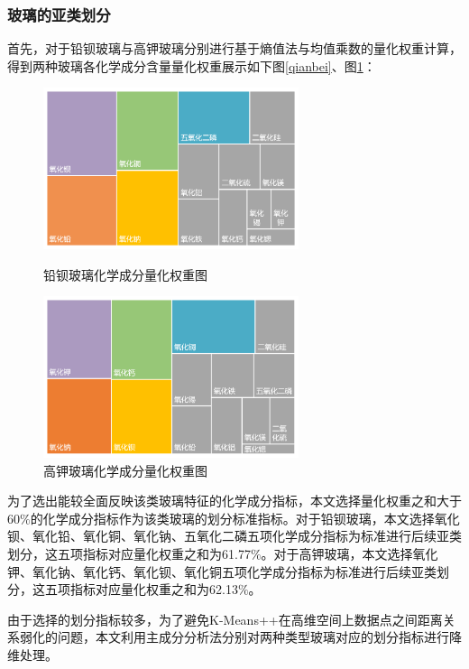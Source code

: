 \documentclass[withoutpreface,bwprint]{cumcmthesis} %
\begin{document}
\subsubsection{玻璃的亚类划分}

首先，对于铅钡玻璃与高钾玻璃分别进行基于熵值法与均值乘数的量化权重计算，得到两种玻璃各化学成分含量量化权重展示如下图\ref{qianbei}、图\ref{gaojia}：

\begin{figure}[H]
  \centering
  \begin{minipage}[t]{0.48\textwidth}
    \centering
    \includegraphics[width=7.5cm]{figure/铅钡}
    \caption{铅钡玻璃化学成分量化权重图}
    \label{qianbei}
  \end{minipage}
  \begin{minipage}[t]{0.48\textwidth}
    \centering
    \includegraphics[width=7.5cm]{figure/高钾}
    \caption{高钾玻璃化学成分量化权重图}
    \label{gaojia}
  \end{minipage}
\end{figure}

为了选出能较全面反映该类玻璃特征的化学成分指标，本文选择量化权重之和大于60$\%$的化学成分指标作为该类玻璃的划分标准指标。对于铅钡玻璃，本文选择氧化钡、氧化铅、氧化铜、氧化钠、五氧化二磷五项化学成分指标为标准进行后续亚类划分，这五项指标对应量化权重之和为61.77$\%$。对于高钾玻璃，本文选择氧化钾、氧化钠、氧化钙、氧化钡、氧化铜五项化学成分指标为标准进行后续亚类划分，这五项指标对应量化权重之和为62.13$\%$。

由于选择的划分指标较多，为了避免K-Means++在高维空间上数据点之间距离关系弱化的问题，本文利用主成分分析法分别对两种类型玻璃对应的划分指标进行降维处理。
\end{document}
